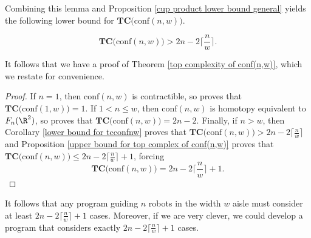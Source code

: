 Combining this lemma and Proposition \ref{cup product lower bound general} yields the following lower bound for $\textbf{TC}\big(\text{conf}(n,w)\big)$.

\begin{cor}\label{lower bound for tcconfnw}
\[
\textbf{TC}\big(\text{conf}(n,w)\big)>2n-2\Big\lceil\frac{n}{w}\Big\rceil.
\]
\end{cor}

It follows that we have a proof of Theorem \ref{top complexity of conf(n,w)}, which we restate for convenience.

\begin{T1}
  \thmtext
\end{T1} 

\begin{proof}
If $n=1$, then $\text{conf}(n,w)$ is contractible, so \cite[Theorem 1]{farber2003topological} proves that $\textbf{TC}\big(\text{conf}(1,w)\big)=1$.
If $1<n\le w$, then $\text{conf}(n,w)$ is homotopy equivalent to $F_{n}(\R^{2})$, so \cite[Theorem 1]{farber2002topological} proves that $\textbf{TC}\big(\text{conf}(n,w)\big)=2n-2$.
Finally, if $n>w$, then Corollary \ref{lower bound for tcconfnw} proves that $\textbf{TC}\big(\text{conf}(n,w)\big)>2n-2\big\lceil\frac{n}{w}\big\rceil$ and Proposition \ref{upper bound for top complex of conf(n,w)} proves that $\textbf{TC}\big(\text{conf}(n,w)\big)\le2n-2\big\lceil\frac{n}{w}\big\rceil+1$, forcing
\[
\textbf{TC}\big(\text{conf}(n,w)\big)=2n-2\Big\lceil\frac{n}{w}\Big\rceil+1.
\]
\end{proof}

It follows that any program guiding $n$ robots in the width $w$ aisle must consider at least $2n-2\big\lceil\frac{n}{w}\big\rceil+1$ cases.
Moreover, if we are very clever, we could develop a program that considers exactly $2n-2\big\lceil\frac{n}{w}\big\rceil+1$ cases.



